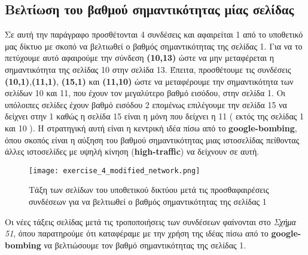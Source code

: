 \documentclass[First Project.tex]{subfiles}
\begin{document}
\subsection{ Βελτίωση του βαθμού σημαντικότητας μίας σελίδας }

Σε αυτή την παράγραφο προσθέτονται 4 συνδέσεις και αφαιρείται 1 από το υποθετικό μας δίκτυο με σκοπό να βελτιωθεί ο βαθμός σημαντικότητας της
σελίδας 1. Για να το πετύχουμε αυτό αφαιρούμε την σύνδεση \textbf{(10,13)} ώστε να μην μεταφέρεται
η σημαντικότητα της σελίδας 10 στην σελίδα 13. Έπειτα, προσθέτουμε τις συνδέσεις \textbf{(10,1)},\textbf{(11,1)},
\textbf{(15,1)} και \textbf{(11,10)} ώστε να μεταφέρουμε την σημαντικότητα των σελίδων 10 και 11, που έχουν 
τον μεγαλύτερο βαθμό εισόδου, στην σελίδα 1. Οι υπόλοιπες σελίδες έχουν βαθμό εισόδου 2 επομένως επιλέγουμε την σελίδα 15 να δείχνει στην 1
καθώς η σελίδα 15 είναι η μόνη που δείχνει η 11 ( εκτός της σελίδας 1 και 10 ). Η στρατηγική αυτή είναι η κεντρική ιδέα πίσω από το 
\textlatin{\textbf{google-bombing}}, όπου σκοπός είναι η αύξηση του βαθμού σημαντικότητας μιας ιστοσελίδας πείθοντας άλλες ιστοσελίδες με 
υψηλή κίνηση (\textlatin{\textbf{high-traffic}}) να δείχνουν σε αυτή.

\begin{figure}[h!]
    \centering
    \captionsetup{justification=centering}
    \begin{center}
        \texttt{[image: exercise\_4\_modified\_network.png]}    
        \caption{ Τάξη των σελίδων του υποθετικού δικτύου μετά τις προσθαφαιρέσεις συνδέσεων για να βελτιωθεί 
        ο βαθμός σημαντικότητας της σελίδας 1 }
    \end{center}
\end{figure} 

Οι νέες τάξεις σελίδας μετά τις τροποποιήσεις των συνδέσεων φαίνονται στο \textit{Σχήμα 51}, όπου παρατηρούμε ότι καταφέραμε με την χρήση της
ιδέας πίσω από το \textlatin{\textbf{google-bombing}} να βελτιώσουμε τον βαθμό σημαντικότητας της σελίδας 1.
\end{document}
